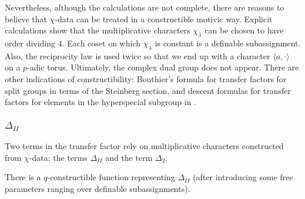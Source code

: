 Nevertheless, although the calculations are not complete, there are reasons to believe that $\chi$-data can be treated in a constructible motivic way.
Explicit calculations show that the multiplicative characters $\chi_\lambda$ can be chosen to have order dividing $4$.  Each coset on which $\chi_\lambda$ is
constant is a definable subassignment.  Also, the reciprocity law is used twice so that we end up with a character $\langle a,\cdot\rangle$ on a $p$-adic torus.
Ultimately, the complex dual group does not appear.  
There are other indications of constructibility: Bouthier's formula for transfer factors for split groups in terms of the Steinberg section, 
and descent formulas for transfer factors for elements in the hyperspecial subgroup in \cite{hales1993simple}.

\subsubsection{$\Delta_{II}$}
Two terms in the transfer factor rely on multiplicative characters constructed from $\chi$-data: the terms $\Delta_{II}$ and the term $\Delta_2$.

\begin{lemma}  There is a $q$-constructible function representing $\Delta_{II}$ (after introducing some free parameters ranging over definable subassignments).
\end{lemma}

